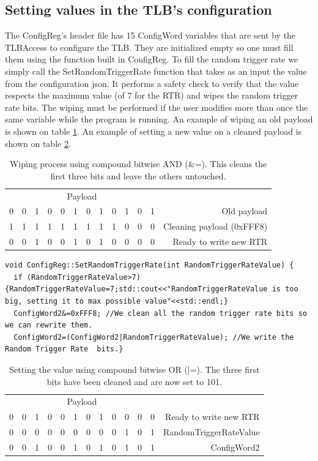 \subsection{Setting values in the TLB's configuration}

The ConfigReg's header file has 15 ConfigWord variables that are sent by the TLBAccess to configure the TLB. They are initialized empty so one must fill them using the function built in ConfigReg. To fill the random trigger rate we simply call the SetRandomTriggerRate function that takes as an input the value from the configuration json. It performs a safety check to verify that the value respects the maximum value (of 7 for the RTR) and wipes the random trigger rate bits. The wiping must be performed if the user modifies more than once the same variable while the program is running. An example of wiping an old payload is shown on table \ref{tab:CompooundBitwiseAND}. An example of setting a new value on a cleaned payload is shown on table \ref{tab:CompooundBitwiseOR}.

\begin{table}[htbp]
  \centering
  \caption{Wiping process using compound bitwise AND (\&=). This cleans the first three bits and leave the others untouched.}
    \begin{tabular}{ccccccccccccr}
    \multicolumn{12}{c}{Payload} & \multicolumn{1}{c}{} \\
    0&0&1&0&0&1&0&1&0&1&0&1& Old payload \\
    1&1&1&1&1&1&1&1&1&0&0&0& Cleaning payload (0xFFF8) \\
    \midrule
    0&0&1&0&0&1&0&1&0&0&0&0& Ready to write new RTR \\
    \end{tabular}
  \label{tab:CompooundBitwiseAND}
\end{table}


\begin{lstlisting}
void ConfigReg::SetRandomTriggerRate(int RandomTriggerRateValue) {
  if (RandomTriggerRateValue>7){RandomTriggerRateValue=7;std::cout<<"RandomTriggerRateValue is too big, setting it to max possible value"<<std::endl;}
  ConfigWord2&=0xFFF8; //We clean all the random trigger rate bits so we can rewrite them.
  ConfigWord2=(ConfigWord2|RandomTriggerRateValue); //We write the Random Trigger Rate  bits.}
\end{lstlisting}

\begin{table}[htbp]
  \centering
  \caption{Setting the value using compound bitwise OR (|=). The three first bits have been cleaned and are now set to 101.}
    \begin{tabular}{ccccccccccccr}
    \multicolumn{12}{c}{Payload} & \multicolumn{1}{c}{} \\
    0&0&1&0&0&1&0&1&0&0&0&0& Ready to write new RTR \\
    0&0&0&0&0&0&0&0&0&1&0&1& RandomTriggerRateValue \\
    \midrule
    0&0&1&0&0&1&0&1&0&1&0&1& ConfigWord2 \\
    \end{tabular}
  \label{tab:CompooundBitwiseOR}
\end{table}

